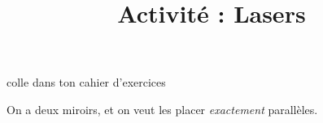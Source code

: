 \documentclass[a4paper,10pt]{article}
\title{Activité : Lasers}
\date{}
\author{}
\makeatletter
\renewcommand{\maketitle}{%
{\scriptsize colle dans ton cahier d'exercices}
	\begin{center}
		\LARGE
		\myuline{\@title}
		\vspace{0.5em}
	\end{center}
}
\makeatother
\begin{document}
\renewcommand{\arraystretch}{1.5}

\maketitle

On a deux miroirs, et on veut les placer \textit{exactement} parallèles.
\end{document}
